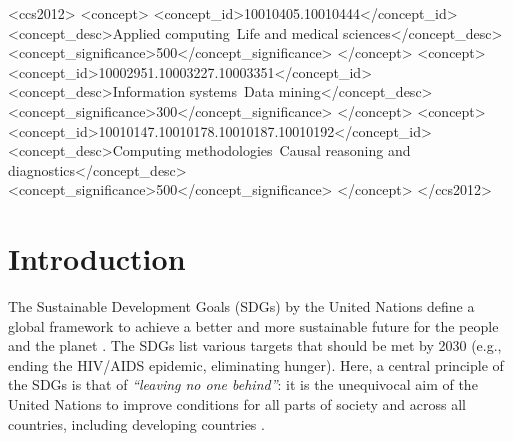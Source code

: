\documentclass[sigconf]{acmart}
\begin{document}
\begin{CCSXML}
<ccs2012>
   <concept>
       <concept_id>10010405.10010444</concept_id>
       <concept_desc>Applied computing~Life and medical sciences</concept_desc>
       <concept_significance>500</concept_significance>
       </concept>
   <concept>
       <concept_id>10002951.10003227.10003351</concept_id>
       <concept_desc>Information systems~Data mining</concept_desc>
       <concept_significance>300</concept_significance>
       </concept>
   <concept>
       <concept_id>10010147.10010178.10010187.10010192</concept_id>
       <concept_desc>Computing methodologies~Causal reasoning and diagnostics</concept_desc>
       <concept_significance>500</concept_significance>
       </concept>
 </ccs2012>
\end{CCSXML}




\maketitle


\section{Introduction}


The Sustainable Development Goals (SDGs) by the United Nations define a global framework to achieve a better and more sustainable future for the people and the planet \cite{UNsdg2015}. The SDGs list various targets that should be met by 2030 (e.g., ending the HIV/AIDS epidemic, eliminating hunger). Here, a central principle of the SDGs is that of \emph{``leaving no one behind''}: it is the unequivocal aim of the United Nations to improve conditions for all parts of society and across all countries, including developing countries \cite{UNreport2018}.
\end{document}
